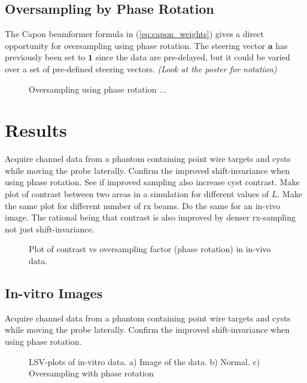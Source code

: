 \documentclass[journal]{IEEEtran}
\renewcommand{\vec}[1]{\mathbf{#1}}
\newcommand{\img}{img/}
\newcommand\comment[1]{\textit{{\color{red}(#1)}}}
\begin{document}
\subsection{Oversampling by Phase Rotation}
The Capon beamformer formula in (\ref{eq:capon_weights}) gives a direct opportunity for oversampling using phase rotation. The steering vector $\vec{a}$ has previously been set to $\vec{1}$ since the data are pre-delayed, but it could be varied over a set of pre-defined steering vectors. \comment{Look at the poster for notation}

\begin{figure*}[!t]
	\centerline{
	}
	\caption{Oversampling using phase rotation ...}
	\label{fig:benchmark_capon_bs}
\end{figure*}

\section{Results}\label{sec:res}

Acquire channel data from a phantom containing point wire targets and cysts while moving the probe laterally. Confirm the improved shift-invariance when using phase rotation. See if improved sampling also increase cyst contrast.
Make plot of contrast between two areas in a simulation for different values of $L$. Make the same plot for different number of rx beams. Do the same for an in-vivo image. The rational being that contrast is also improved by denser rx-sampling not just shift-invariance. 

\begin{figure}\caption{Plot of contrast vs oversampling factor (phase rotation) in in-vivo data.}
\end{figure}

\subsection{In-vitro Images}
Acquire channel data from a phantom containing point wire targets and cysts while moving the probe laterally. Confirm the improved shift-invariance when using phase rotation. 

\begin{figure*}[!t]
\centerline{
\hfill{}
\hfill{}
}
\caption{LSV-plots of in-vitro data. a) Image of the data. b) Normal. c) Oversampling with phase rotation}
\label{fig:das}
\end{figure*}
\end{document}
